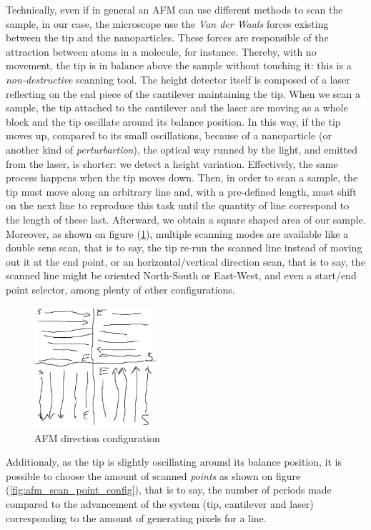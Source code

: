\documentclass{article}
\numberwithin{equation}{section}
\begin{document}
Technically, even if in general an AFM can use different methods to scan the sample, in our case, the microscope use the \textit{Van der Waals} forces existing between the tip and the nanoparticles. These forces are responsible of the attraction between atoms in a molecule, for instance. Thereby, with no movement, the tip is in balance above the sample without touching it: this is a \textit{non-destructive} scanning tool. The height detector itself is composed of a laser reflecting on the end piece of the cantilever maintaining the tip. When we scan a sample, the tip attached to the cantilever and the laser are moving as a whole block and the tip oscillate around its balance position. In this way, if the tip moves up, compared to its small oscillations, because of a nanoparticle (or another kind of \textit{perturbartion}), the optical way runned by the light, and emitted from the laser, is shorter: we detect a height variation. Effectively, the same process happens when the tip moves down. Then, in order to scan a sample, the tip must move along an arbitrary line and, with a pre-defined length, must shift on the next line to reproduce this task until the quantity of line correspond to the length of these last. Afterward, we obtain a square shaped area of our sample. Moreover, as shown on figure (\ref{fig:afm_scan_dir_config}), multiple scanning modes are available like a double sens scan, that is to say, the tip re-run the scanned line instead of moving out it at the end point, or an horizontal/vertical direction scan, that is to say, the scanned line might be oriented North-South or East-West, and even a start/end point selector, among plenty of other configurations.
\begin{figure}[h]
    \centering
    \includegraphics[width=0.4\textwidth, height=0.32\textwidth]{afm_scan_dir_config.png}
    \caption{AFM direction configuration}
    \label{fig:afm_scan_dir_config}
\end{figure}
Additionaly, as the tip is slightly oscillating around its balance position, it is possible to choose the amount of scanned \textit{points} as shown on figure (\ref{fig:afm_scan_point_config}), that is to say, the number of periods made compared to the advancement of the system (tip, cantilever and laser) corresponding to the amount of generating pixels for a line. 
\end{document}
